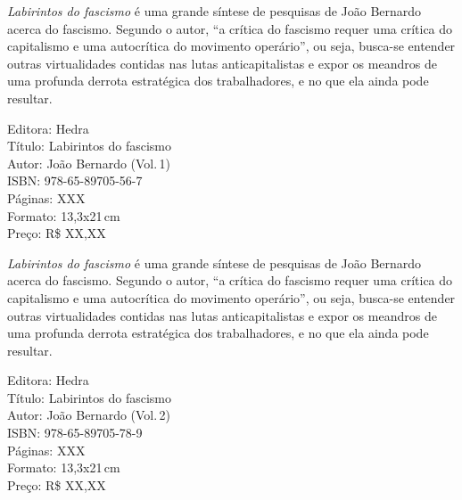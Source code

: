 \pagestyle{hedra}
\label{hedra}



\noindent{}\textit{Labirintos do fascismo} é uma grande síntese de pesquisas de João Bernardo acerca do fascismo. Segundo o autor, ``a crítica do fascismo requer uma crítica do capitalismo e uma autocrítica do movimento operário'', ou seja, busca-se entender outras virtualidades contidas nas lutas anticapitalistas e expor os meandros de uma profunda derrota estratégica dos trabalhadores, e no que ela ainda pode resultar. %

\begin{ficha}
Editora: Hedra\\
Título: Labirintos do fascismo\\
Autor: João Bernardo (Vol.\,1)\\ 
ISBN: 978-65-89705-56-7\\
Páginas: XXX\\
Formato: 13,3x21\,cm\\
Preço: R\$ XX,XX\\
\end{ficha}

\pagebreak


\noindent{}\textit{Labirintos do fascismo} é uma grande síntese de pesquisas de João Bernardo acerca do fascismo. Segundo o autor, ``a crítica do fascismo requer uma crítica do capitalismo e uma autocrítica do movimento operário'', ou seja, busca-se entender outras virtualidades contidas nas lutas anticapitalistas e expor os meandros de uma profunda derrota estratégica dos trabalhadores, e no que ela ainda pode resultar. %

\begin{ficha}
Editora: Hedra\\
Título: Labirintos do fascismo\\
Autor: João Bernardo (Vol.\,2)\\ 
ISBN: 978-65-89705-78-9\\
Páginas: XXX\\
Formato: 13,3x21\,cm\\
Preço: R\$ XX,XX\\
\end{ficha}

\pagebreak



